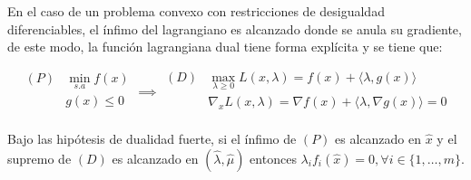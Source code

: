 En el caso de un problema convexo con restricciones de desigualdad diferenciables, el ínfimo del lagrangiano es alcanzado donde se anula su gradiente, de este modo, la función lagrangiana dual tiene forma explícita y se tiene que:

\begin{equation}
	\begin{aligned}
		(P) & \min_{s.a} f(x)\\
		& g(x) \leq 0\\
	\end{aligned} \implies
	\begin{aligned}
		(D) & \max_{\lambda\geq 0} L(x,\lambda)= f(x) + \langle\lambda,g(x)\rangle\\
		& \nabla_x L(x,\lambda) = \nabla f(x) + \langle\lambda,\nabla g(x)\rangle = 0\\
	\end{aligned}
\end{equation}


\begin{theorem}
	Bajo las hipótesis de dualidad fuerte, si el ínfimo de $(P)$ es alcanzado en $\hat{x}$ y el supremo de $(D)$ es alcanzado en $(\hat{\lambda},\hat{\mu})$ entonces $\lambda_i f_i(\hat{x})=0, \forall i\in\{1,\ldots,m\}$.
\end{theorem}
